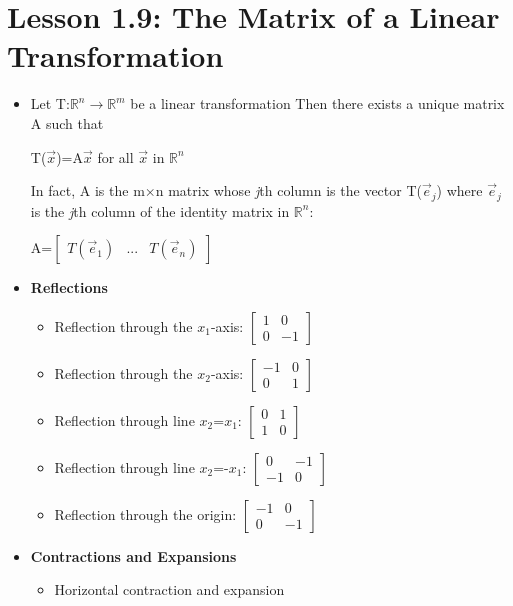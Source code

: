 \documentclass{report}
\newcommand{\Ax}{A$\vec{x}$}
\newcommand{\Vx}{$\vec{x}$}
\newcommand{\mxn}{m$\times$n}
\newcommand{\Rn}{$\mathbb{R}^n$}
\newcommand{\Rm}{$\mathbb{R}^m$}
\begin{document}
\section{Lesson 1.9: The Matrix of a Linear Transformation}
	\begin{itemize}\addtolength{\leftskip}{2em}
		\item Let T:{\Rn}$\rightarrow${\Rm} be a linear transformation Then there exists a unique matrix A such that 
		\begin{center}
		T(\Vx)={\Ax} for all {\Vx} in {\Rn}
		\end{center}
		In fact, A is the {\mxn} matrix whose \textit{j}th column is the vector T($\vec{e}_j$) where $\vec{e}_j$ is the \textit{j}th column of the identity matrix in {\Rn}:
		\begin{center}
		A=$\begin{bmatrix}
		T(\vec{e}_1) & ... & {T(\vec{e}_n)}
		\end{bmatrix}$
		\end{center}
		\item \textbf{Reflections}
		\begin{itemize}\addtolength{\leftskip}{2em}
			\item Reflection through the $x_1$-axis: 
				$\begin{bmatrix}
				1 & 0\\
				0 & -1
				\end{bmatrix}$
			\item Reflection through the $x_2$-axis: 
				$\begin{bmatrix}
				-1 & 0\\
				0 & 1
				\end{bmatrix}$
			\item Reflection through line $x_2$=$x_1$: 
				$\begin{bmatrix}
				0 & 1\\
				1 & 0
				\end{bmatrix}$
			\item Reflection through line $x_2$=-$x_1$:
				$\begin{bmatrix}
				0 & -1\\
				-1 & 0
				\end{bmatrix}$ 
			\item Reflection through the origin:
				$\begin{bmatrix}
				-1 & 0\\
				0 & -1
				\end{bmatrix}$
	
			
		\end{itemize}
		\item \textbf{Contractions and Expansions}
		\begin{itemize}\addtolength{\leftskip}{2em}
			\item Horizontal contraction and expansion
			

\end{itemize}
\end{itemize}
\end{document}
